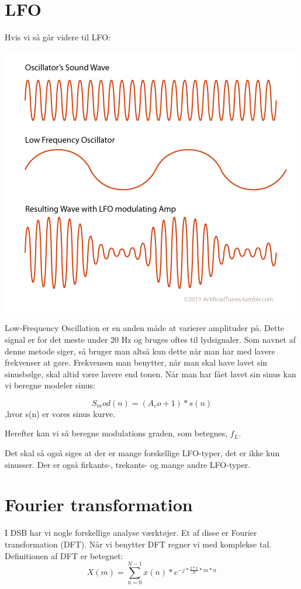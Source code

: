 \documentclass[12pt, letterpaper]{article}
\begin{document}
\section*{LFO}

Hvis vi så går videre til LFO: 

\begin{center}
\includegraphics[width=\textwidth]{billeder/LFO}
\end{center}

Low-Frequency Oscillation er en anden måde at varierer amplituder på. 
Dette signal er for det meste under 20 Hz og bruges oftes til lydsignaler. Som navnet af denne metode siger, så bruger man altså kun dette når man har med lavere frekvenser at gøre. Frekvensen man benytter, når man skal have lavet sin sinusbølge, skal altid være lavere end tonen. 
Når man har fået lavet sin sinus kan vi beregne modeler sinus: 

$$S_mod (n) = (A_vo + 1)*s(n)$$
,hvor s(n) er vores sinus kurve. 

Herefter kan vi så beregne modulations graden, som betegnes, $f_L$.

Det skal så også siges at der er mange forskellige LFO-typer, det er ikke kun sinusser. Der er også firkants-, trekants-  og mange andre LFO-typer. 

\section*{Fourier transformation}
I DSB har vi nogle forskellige analyse værktøjer. Et af disse er Fourier transformation (DFT). Når vi benytter DFT regner vi med komplekse tal. 
Definitionen af DFT er betegnet: 
$$X(m)= \sum\limits_{n=0}^{N-1} x(n)*e^{-j*\frac{2*\pi}{N}*m*n}$$
\end{document}
